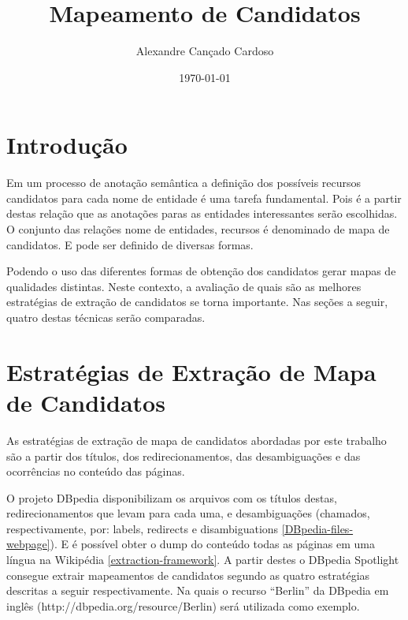 \documentclass[10pt,a4paper]{llncs}
\title{Mapeamento de Candidatos}
\author{Alexandre Cançado Cardoso}
\institute{Intrinsic Soluções em Informática M.E.}
\date{\today}
\begin{document}
\maketitle


\section{Introdução} \label{introducao}
\indent\indent Em um processo de anotação semântica a definição dos possíveis recursos candidatos para cada nome de entidade é uma tarefa fundamental. Pois é a partir destas relação que as anotações paras as entidades interessantes serão escolhidas. O conjunto das relações nome de entidades, recursos é denominado de mapa de candidatos. E pode ser definido de diversas formas.

Podendo o uso das diferentes formas de obtenção dos candidatos gerar mapas de qualidades distintas. Neste contexto, a avaliação de quais são as melhores estratégias de extração de candidatos se torna importante. Nas seções a seguir, quatro destas técnicas serão comparadas.


\section{Estratégias de Extração de Mapa de Candidatos} \label{extracao-mapa-candidatos}
\indent\indent As estratégias de extração de mapa de candidatos abordadas por este trabalho são a partir dos títulos, dos redirecionamentos, das desambiguações e das ocorrências no conteúdo das páginas.

O projeto DBpedia disponibilizam os arquivos com os títulos destas, redirecionamentos que levam para cada uma, e desambiguações (chamados, respectivamente, por: labels, redirects e disambiguations \ref{DBpedia-files-webpage}). E é possível obter o dump do conteúdo todas as páginas em uma língua na Wikipédia \ref{extraction-framework}. A partir destes o DBpedia Spotlight consegue extrair mapeamentos de candidatos segundo as quatro estratégias descritas a seguir respectivamente. %
Na quais o recurso ``Berlin'' da DBpedia em inglês (http://dbpedia.org/resource/Berlin) será utilizada como exemplo.
\end{document}
